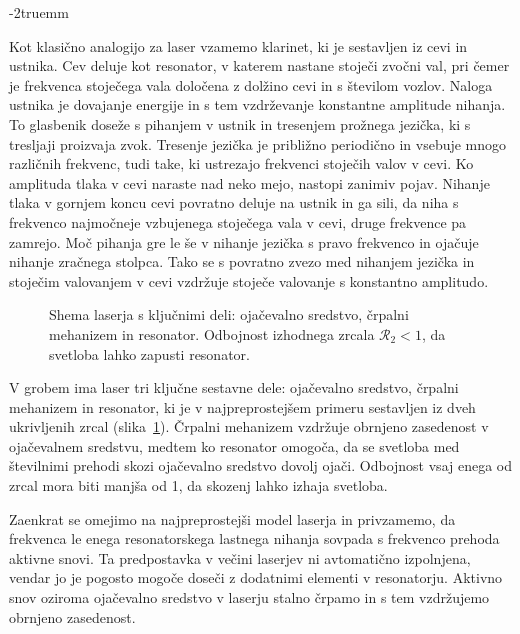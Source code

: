 \vglue-2truemm
\begin{remark}
Kot klasično analogijo za laser vzamemo klarinet, ki je sestavljen iz 
cevi in ustnika. Cev deluje kot resonator, v katerem nastane 
stoječi zvočni val, pri čemer je frekvenca stoječega vala določena z 
dolžino cevi in s številom vozlov. Naloga ustnika je dovajanje energije 
in s tem vzdrževanje konstantne amplitude nihanja. To glasbenik doseže s 
pihanjem v ustnik in tresenjem prožnega jezička, ki s tresljaji proizvaja 
zvok. Tresenje jezička je približno periodično in vsebuje mnogo različnih 
frekvenc, tudi take, ki ustrezajo frekvenci stoječih valov v cevi. 
Ko amplituda tlaka v cevi naraste nad neko mejo, nastopi zanimiv
pojav. Nihanje tlaka v gornjem koncu cevi povratno deluje na ustnik
in ga sili, da niha s frekvenco najmočneje vzbujenega stoječega vala v cevi,
druge frekvence pa zamrejo. Moč pihanja gre le še v
nihanje jezička s pravo frekvenco in ojačuje nihanje zračnega stolpca. 
Tako se s povratno zvezo med nihanjem jezička in stoječim valovanjem v cevi
vzdržuje stoječe valovanje s konstantno amplitudo. 
\end{remark}

\begin{figure}[ht]
\centering
\def\svgwidth{80truemm} 

\caption{Shema laserja s ključnimi deli: ojačevalno sredstvo, črpalni mehanizem in resonator.
Odbojnost izhodnega zrcala $\mathcal{R}_2<1$, da svetloba lahko zapusti resonator.}
\label{fig:shemalaserja}
\end{figure}

V grobem ima laser tri ključne sestavne dele: ojačevalno sredstvo, 
črpalni mehanizem in resonator, ki je v najpreprostejšem primeru sestavljen iz dveh 
ukrivljenih zrcal (slika~\ref{fig:shemalaserja}). Črpalni 
mehanizem vzdržuje obrnjeno zasedenost v ojačevalnem sredstvu, medtem ko resonator 
omogoča, da se svetloba med številnimi prehodi skozi ojačevalno sredstvo dovolj ojači.
Odbojnost vsaj enega od zrcal 
mora biti manjša od 1, da skozenj lahko izhaja svetloba.

Zaenkrat se omejimo na najpreprostejši model laserja in 
privzamemo, da frekvenca le enega resonatorskega lastnega nihanja sovpada s 
frekvenco prehoda aktivne snovi. Ta predpostavka v večini laserjev ni
avtomatično izpolnjena, vendar jo je pogosto mogoče doseči z dodatnimi elementi 
v resonatorju. Aktivno snov oziroma ojačevalno sredstvo v laserju stalno 
črpamo in s tem vzdržujemo obrnjeno zasedenost. 

